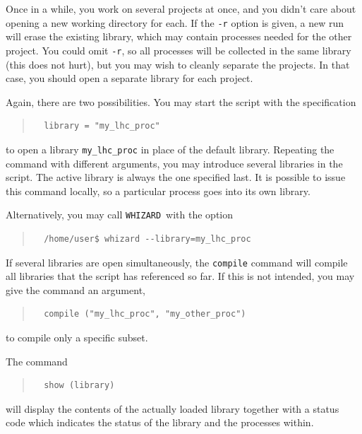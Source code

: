 \documentclass[12pt]{book}
\newcommand{\ttt}[1]{\texttt{#1}}
\newcommand{\whizard}{\ttt{WHIZARD}}
\begin{document}
Once in a while, you work on several projects at once, and you didn't care
about opening a new working directory for each.  If the \verb|-r| option is
given, a new run will erase the existing library, which may contain processes
needed for the other project.  You could omit \verb|-r|, so all processes will
be collected in the same library (this does not hurt), but you may wish to
cleanly separate the projects.  In that case, you should open a separate
library for each project.

Again, there are two possibilities.  You may start the script with the
specification
\begin{quote}
\begin{footnotesize}
\begin{verbatim}
  library = "my_lhc_proc"
\end{verbatim}
\end{footnotesize}
\end{quote}
to open a library \verb|my_lhc_proc| in place of the default library.
Repeating the command with different arguments, you may introduce several
libraries in the script.  The active library is always the one specified
last.  It is possible to issue this command locally, so a particular process
goes into its own library.

Alternatively, you may call \whizard\ with the option
\begin{quote}
\begin{footnotesize}
\begin{verbatim}
  /home/user$ whizard --library=my_lhc_proc
\end{verbatim}
\end{footnotesize}
\end{quote}

If several libraries are open simultaneously, the \ttt{compile} command will
compile all libraries that the script has referenced so far.  If this is not
intended, you may give the command an argument,
\begin{quote}
\begin{footnotesize}
\begin{verbatim}
  compile ("my_lhc_proc", "my_other_proc")
\end{verbatim}
\end{footnotesize}
\end{quote}
to compile only a specific subset.

The command
\begin{quote}
\begin{footnotesize}
\begin{verbatim}
  show (library)
\end{verbatim}
\end{footnotesize}
\end{quote}
will display the contents of the actually loaded library together with
a status code which indicates the status of the library and the processes within.
\end{document}
